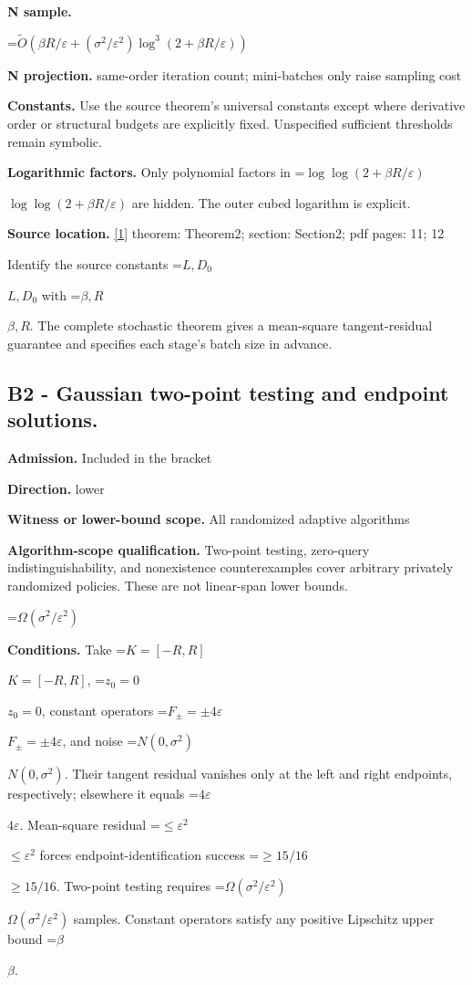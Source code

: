 \documentclass[10pt,a4paper]{article}
\newcommand{\AtlasMath}[1]{\par\begingroup\centering\setbox0=\hbox{$\displaystyle #1$}\ifdim\wd0>1.4\linewidth\typeout{ATLAS WIDE FORMULA: \the\wd0}\fi\ifdim\wd0>\linewidth\resizebox{\linewidth}{!}{\box0}\else\box0\fi\par\endgroup}
\newcommand{\AtlasInlineMath}[1]{\begingroup\setbox0=\hbox{$#1$}\ifdim\wd0>.4\linewidth\endgroup\AtlasMath{#1}\else\endgroup$#1$\fi}
\begin{document}
\textbf{N sample.}

\AtlasMath{\widetilde O(\beta R/\varepsilon+(\sigma^2/\varepsilon^2)\log^3(2+\beta R/\varepsilon))}
\textbf{N projection.} same-order iteration count; mini-batches only raise sampling cost

\textbf{Constants.} Use the source theorem’s universal constants except where derivative order or structural budgets are explicitly fixed. Unspecified sufficient thresholds remain symbolic.

\textbf{Logarithmic factors.} Only polynomial factors in \AtlasInlineMath{\log\log(2+\beta R/\varepsilon)} are hidden. The outer cubed logarithm is explicit.

\textbf{Source location.} \href{https://arxiv.org/pdf/2609.04188v2}{[1]} theorem: Theorem2; section: Section2; pdf pages: 11; 12

Identify the source constants \AtlasInlineMath{L,D_0} with \AtlasInlineMath{\beta,R}. The complete stochastic theorem gives a mean-square tangent-residual guarantee and specifies each stage's batch size in advance.

\subsection{B2 - Gaussian two-point testing and endpoint solutions.}
\textbf{Admission.} Included in the bracket

\textbf{Direction.} lower

\textbf{Witness or lower-bound scope.} All randomized adaptive algorithms

\textbf{Algorithm-scope qualification.} Two-point testing, zero-query indistinguishability, and nonexistence counterexamples cover arbitrary privately randomized policies. These are not linear-span lower bounds.

\AtlasMath{\Omega(\sigma^2/\varepsilon^2)}
\textbf{Conditions.} Take \AtlasInlineMath{K=[-R,R]}, \AtlasInlineMath{z_0=0}, constant operators \AtlasInlineMath{F_\pm=\pm4\varepsilon}, and noise \AtlasInlineMath{N(0,\sigma^2)}. Their tangent residual vanishes only at the left and right endpoints, respectively; elsewhere it equals \AtlasInlineMath{4\varepsilon}. Mean-square residual \AtlasInlineMath{\le\varepsilon^2} forces endpoint-identification success \AtlasInlineMath{\ge15/16}. Two-point testing requires \AtlasInlineMath{\Omega(\sigma^2/\varepsilon^2)} samples. Constant operators satisfy any positive Lipschitz upper bound \AtlasInlineMath{\beta}.
\end{document}
